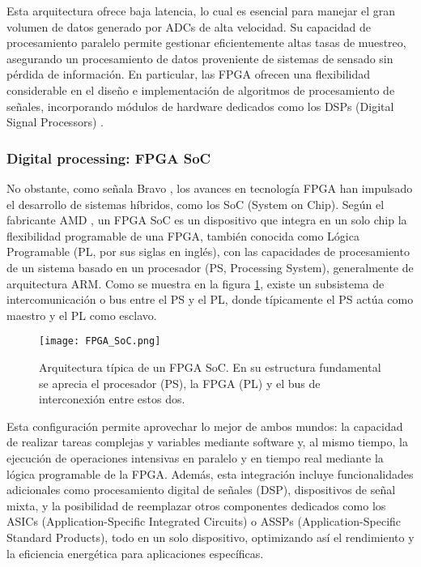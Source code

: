 \documentclass{report}
\begin{document}
\noindent Esta arquitectura ofrece baja latencia, lo cual es esencial para manejar el gran volumen de datos generado por ADCs de alta velocidad. Su capacidad de procesamiento paralelo permite gestionar eficientemente altas tasas de muestreo, asegurando un procesamiento de datos proveniente de sistemas de sensado sin pérdida de información. En particular, las FPGA ofrecen una flexibilidad considerable en el diseño e implementación de algoritmos de procesamiento de señales, incorporando módulos de hardware dedicados como los DSPs (Digital Signal Processors) \cite{meyer2007digital}.\\

\subsubsection{Digital processing: FPGA SoC}

\noindent No obstante, como señala Bravo \cite{bravo2020new}, los avances en tecnología FPGA han impulsado el desarrollo de sistemas híbridos, como los SoC (System on Chip). Según el fabricante AMD \cite{amd_zynq_7000}, un FPGA SoC es un dispositivo que integra en un solo chip la flexibilidad programable de una FPGA, también conocida como Lógica Programable (PL, por sus siglas en inglés), con las capacidades de procesamiento de un sistema basado en un procesador (PS, Processing System), generalmente de arquitectura ARM. Como se muestra en la figura \ref{fig:fpga_soc}, existe un subsistema de intercomunicación o bus entre el PS y el PL, donde típicamente el PS actúa como maestro y el PL como esclavo. \\

\begin{figure}[h]
    \centering
    \texttt{[image: FPGA\_SoC.png]}
    \caption{Arquitectura típica de un FPGA SoC. En su estructura fundamental se aprecia el procesador (PS), la FPGA (PL) y el bus de interconexión entre estos dos.}
    \label{fig:fpga_soc}

\end{figure}

\noindent Esta configuración permite aprovechar lo mejor de ambos mundos: la capacidad de realizar tareas complejas y variables mediante software y, al mismo tiempo, la ejecución de operaciones intensivas en paralelo y en tiempo real mediante la lógica programable de la FPGA. Además, esta integración incluye funcionalidades adicionales como procesamiento digital de señales (DSP), dispositivos de señal mixta, y la posibilidad de reemplazar otros componentes dedicados como los ASICs (Application-Specific Integrated Circuits) o ASSPs (Application-Specific Standard Products), todo en un solo dispositivo, optimizando así el rendimiento y la eficiencia energética para aplicaciones específicas.\\
\end{document}
